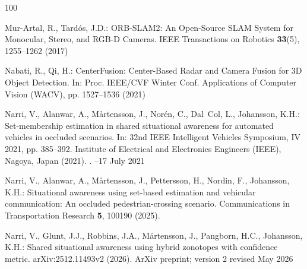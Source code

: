 \documentclass[graybox,envcountchap]{style/SNmono}
\begin{document}
\begin{thebibliography}{100}
{\color{red} 
Mur-Artal, R., Tard{\'o}s, J.D.: {ORB-SLAM2: An Open-Source SLAM System for
  Monocular, Stereo, and RGB-D Cameras}.
\newblock IEEE Transactions on Robotics \textbf{33}(5), 1255--1262 (2017)

\par}
{\color{red} 
Nabati, R., Qi, H.: {CenterFusion: Center-Based Radar and Camera Fusion for 3D
  Object Detection}.
\newblock In: Proc. IEEE/CVF Winter Conf. Applications of Computer Vision
  (WACV), pp. 1527--1536 (2021)

\par}

Narri, V., Alanwar, A., M{\aa}rtensson, J., Nor{\'e}n, C., Dal~Col, L.,
  Johansson, K.H.: Set-membership estimation in shared situational awareness
  for automated vehicles in occluded scenarios.
\newblock In: 32nd IEEE Intelligent Vehicles Symposium, IV 2021, pp. 385--392.
  Institute of Electrical and Electronics Engineers (IEEE), Nagoya, Japan
  (2021).
\newblock {}.
--17 July 2021



Narri, V., Alanwar, A., M{\aa}rtensson, J., Pettersson, H., Nordin, F.,
  Johansson, K.H.: Situational awareness using set-based estimation and
  vehicular communication: An occluded pedestrian-crossing scenario.
\newblock Communications in Transportation Research \textbf{5}, 100190 (2025).
\newblock {}


{\color{red} 
Narri, V., Glunt, J.J., Robbins, J.A., M{\aa}rtensson, J., Pangborn, H.C.,
  Johansson, K.H.: Shared situational awareness using hybrid zonotopes with
  confidence metric.
\newblock arXiv:2512.11493v2 (2026).
\newblock ArXiv preprint; version 2 revised May 2026

}
\end{thebibliography}
\end{document}
